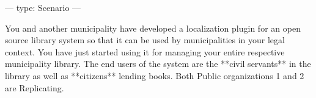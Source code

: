 ---
type: Scenario
---

You and another municipality have developed a localization plugin for an open source library system so that it can be used by municipalities in your legal context. You have just started using it for managing your entire respective municipality library. The end users of the system are the **civil servants** in the library as well as **citizens** lending books. Both Public organizations 1 and 2 are Replicating.
